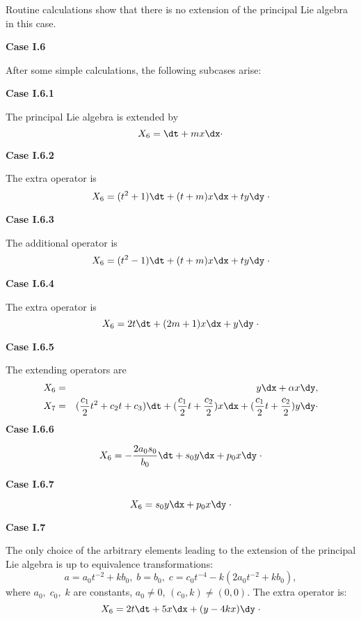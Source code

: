 Routine calculations show that there is no extension of the principal Lie
algebra in this case.

{\bf Case I.6 }

After some simple calculations, the following subcases arise:

{\bf Case I.6.1  }

The principal Lie algebra is extended by
\[X_6=\dt+mx\dx \cdot \]

{\bf Case I.6.2  }

The extra operator is
\[X_6=(t^2+1)\dt+(t+m)x\dx+ty\dy \;\cdot\]

{\bf Case I.6.3  }

The additional operator is
\[X_6=(t^2-1)\dt+(t+m)x\dx+ty\dy \; \cdot\]

{\bf Case I.6.4  }

The extra operator is
\[X_6=2t\dt+(2m+1)x\dx+y\dy \;\cdot\]

{\bf Case I.6.5  }

The extending operators are
\begin{eqnarray*}
X_6 &=& y\dx+\alpha x\dy ,\\
X_7 & = & (\frac{c_1}{2}t^2+c_2t+c_3)\dt +(\frac{c_1}{2}t+\frac{c_2}{2})x\dx
+(\frac{c_1}{2}t+\frac{c_2}{2})y\dy \cdot
\end{eqnarray*}
{\bf Case I.6.6  }

\[X_6=-\frac{2a_0s_0}{b_0}\dt+s_0y\dx+p_0x\dy \;\cdot\]

{\bf Case I.6.7 } 

\[X_6=s_0y\dx+p_0x\dy\;\cdot\]

{\bf Case I.7 }

The only choice of the arbitrary elements leading to the extension of the
principal Lie algebra is up to equivalence transformations:
\[a=a_0t^{-2}+kb_0,\; b=b_0,\; c=c_0t^{-4}-k(2a_0t^{-2}+kb_0),\]
where $a_0,\;c_0,\;k$ are constants, $a_0\ne 0$, $(c_0,k)\ne (0,0)$. The extra
operator is:
\[X_6=2t\dt+5x\dx+(y-4kx)\dy \;\cdot \]

